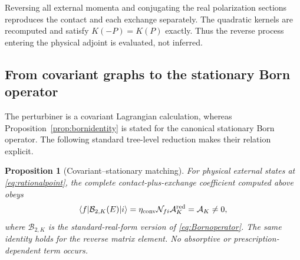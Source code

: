 \documentclass[11pt]{article}
\newtheorem{proposition}[theorem]{Proposition}
\theoremstyle{definition}
\theoremstyle{remark}
\newcommand{\AK}{\mathcal A_K}
\newcommand{\AKred}{\mathcal A_K^{\rm red}}
\newcommand{\Born}{\mathcal B}
\begin{document}
Reversing all external momenta and conjugating the real polarization
sections reproduces the contact and each exchange separately.  The
quadratic kernels are recomputed and satisfy $K(-P)=K(P)$ exactly.  Thus
the reverse process entering the physical adjoint is evaluated, not
inferred.

\subsection{From covariant graphs to the stationary Born operator}

The perturbiner is a covariant Lagrangian calculation, whereas
Proposition~\ref{prop:bornidentity} is stated for the canonical
stationary Born operator.  The following standard tree-level reduction
makes their relation explicit.

\begin{proposition}[Covariant--stationary matching]
\label{prop:covariantborn}
For physical external states at \eqref{eq:rationalpoint}, the complete
contact-plus-exchange coefficient computed above obeys
\begin{equation}
\langle f|\Born_{2,K}(E)|i\rangle
=\eta_{\rm conv}\mathcal N_{fi}\AKred=\AK\ne0,
\end{equation}
where $\Born_{2,K}$ is the standard-real-form version of
\eqref{eq:Bornoperator}.  The same identity holds for the reverse
matrix element.  No absorptive or prescription-dependent term occurs.
\end{proposition}
\end{document}
